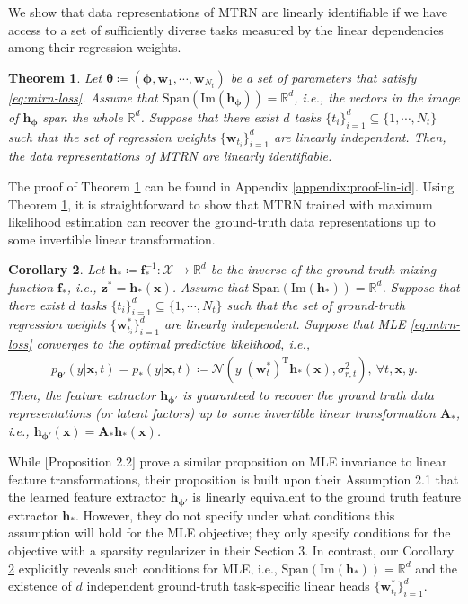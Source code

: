\documentclass{article} %
\theoremstyle{plain}
\newtheorem{theorem}{Theorem}[section]
\newtheorem{corollary}[theorem]{Corollary}
\theoremstyle{definition}
\theoremstyle{remark}
\begin{document}
We show that data representations of MTRN are linearly identifiable if we have access to a set of sufficiently diverse tasks measured by the linear dependencies among their regression weights. 
\begin{theorem}\label{thm:lin-id}
    Let $\boldsymbol{\theta}\coloneqq(\boldsymbol{\phi},\mathbf{w}_1,\cdots,\mathbf{w}_{N_t})$ be a set of parameters that satisfy \eqref{eq:mtrn-loss}. Assume that $\text{Span}(\text{Im}(\mathbf{h}_{\boldsymbol{\phi}}))=\mathbb{R}^d$, i.e., the vectors in the image of $\mathbf{h}_{\boldsymbol{\phi}}$ span the whole $\mathbb{R}^d$. Suppose that there exist $d$ tasks $\{t_i\}_{i=1}^d\subseteq\{1,\cdots,N_t\}$ such that the set of regression weights $\{\mathbf{w}_{t_i}\}_{i=1}^d$ are linearly independent.
    Then, the data representations of MTRN are linearly identifiable.
\end{theorem}
The proof of Theorem \ref{thm:lin-id} can be found in Appendix \ref{appendix:proof-lin-id}. 
Using Theorem \ref{thm:lin-id}, it is straightforward to show that MTRN trained with maximum likelihood estimation can recover the ground-truth data representations up to some invertible linear transformation.
\begin{corollary}\label{cor:lin-id-mtrn}
    Let $\mathbf{h}_{*}\coloneqq\mathbf{f}_*^{-1}:\mathcal{X}\to\mathbb{R}^d$ be the inverse of the ground-truth mixing function $\mathbf{f}_*$, i.e., $\mathbf{z}^*=\mathbf{h}_{*}(\mathbf{x})$. Assume that $\text{Span}(\text{Im}(\mathbf{h}_{*}))=\mathbb{R}^d$. Suppose that there exist $d$ tasks $\{t_i\}_{i=1}^d\subseteq\{1,\cdots,N_t\}$ such that the set of ground-truth regression weights $\{\mathbf{w}_{t_i}^*\}_{i=1}^d$ are linearly independent. Suppose that MLE \eqref{eq:mtrn-loss} converges to the optimal predictive likelihood, i.e.,
\begin{align}
    p_{\boldsymbol{\theta}'}(y|\mathbf{x},t)=p_{*}(y|\mathbf{x},t)\coloneqq\mathcal{N}(y|(\mathbf{w}_t^*)^{\text{T}}\mathbf{h}_{*}(\mathbf{x}),\sigma_{r,t}^2),~\forall t,\mathbf{x},y.
\end{align}
Then, the feature extractor $\mathbf{h}_{\boldsymbol{\phi}'}$ is guaranteed to recover the ground truth data representations (or latent factors) up to some invertible linear transformation $\mathbf{A}_*$, i.e., $\mathbf{h}_{\boldsymbol{\phi}'}(\mathbf{x})=\mathbf{A}_*\mathbf{h}_{*}(\mathbf{x})$.
\end{corollary}
While \citet{Lachapelle_Deleu_Mahajan_Mitliagkas_Bengio_Lacoste-Julien_Bertrand_2023}[Proposition 2.2] prove a similar proposition on MLE invariance to linear feature transformations, their proposition is built upon their Assumption 2.1 that the learned feature extractor $\mathbf{h}_{\boldsymbol{\phi}'}$ is linearly equivalent to the ground truth feature extractor $\mathbf{h}_{*}$. However, they do not specify under what conditions this assumption will hold for the MLE objective; they only specify conditions for the objective with a sparsity regularizer in their Section 3. In contrast, our Corollary \ref{cor:lin-id-mtrn} explicitly reveals such conditions for MLE, i.e., $\text{Span}(\text{Im}(\mathbf{h}_{*}))=\mathbb{R}^d$ and the existence of $d$ independent ground-truth task-specific linear heads $\{\mathbf{w}_{t_i}^*\}_{i=1}^d$.
\end{document}
